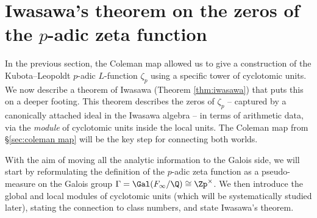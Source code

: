 \documentclass[a4paper,10pt, english, reqno]{smfart}
\newcommand{\GG}{\Gamma}
\numberwithin{equation}{section}
\begin{document}




\section{Iwasawa's theorem on the zeros of the $p$-adic zeta function}\label{sec:iwasawa zeros}

In the previous section, the Coleman map allowed us to give a construction of the Kubota--Leopoldt $p$-adic $L$-function $\zeta_p$ using a specific tower of cyclotomic units. We now describe a theorem of Iwasawa  (Theorem \ref{thm:iwasawa}) that puts this on a deeper footing. This theorem describes the zeros of $\zeta_p$ -- captured by a canonically attached ideal in the Iwasawa algebra -- in terms of arithmetic data, via the \emph{module} of cyclotomic units inside the local units. The Coleman map from \S\ref{sec:coleman map} will be the key step for connecting both worlds.

 With the aim of moving all the analytic information to the Galois side, we will start by reformulating the definition of the $p$-adic zeta function as a pseudo-measure on the Galois group $\GG = \Gal(F_\infty/\Q) \cong \Zp^\times$. We then introduce the global and local modules of cyclotomic units (which will be systematically studied later), stating the connection to class numbers, and state Iwasawa's theorem.



\end{document}
